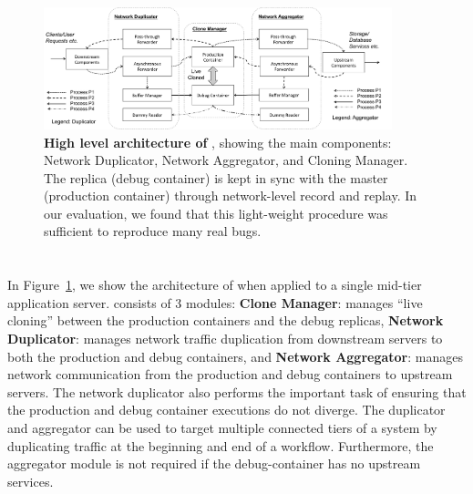 

\begin{figure}[t]
	\begin{centering}
		\includegraphics[width=0.9\textwidth]{parikshan/figs/arch_full.pdf}
		\caption{\textbf{High level architecture of \parikshan}, showing the main components: Network Duplicator, Network Aggregator, and Cloning Manager. The replica (debug container) is kept in sync with the master (production container) through network-level record and replay. In our evaluation, we found that this light-weight procedure was sufficient to reproduce many real bugs.}
		\label{fig:network_arch}
	\end{centering}
\end{figure}



\section{\parikshan}
\label{sec:parikshanDesign}

In Figure~\ref{fig:network_arch}, we show the architecture of \parikshan when applied to a single mid-tier application server.
\parikshan consists of 3 modules: 
\textbf{Clone Manager}: manages ``live cloning'' between the production containers and the debug replicas, 
\textbf{Network Duplicator}: manages network traffic duplication from downstream servers to both the production and debug containers, 
and \textbf{Network Aggregator}: manages network communication from the production and debug containers to upstream servers.
The network duplicator also performs the important task of ensuring that the production and debug container executions do not diverge.
The duplicator and aggregator can be used to target multiple connected tiers of a system by duplicating traffic at the beginning and end of a workflow.
Furthermore, the aggregator module is not required if the debug-container has no upstream services. 


